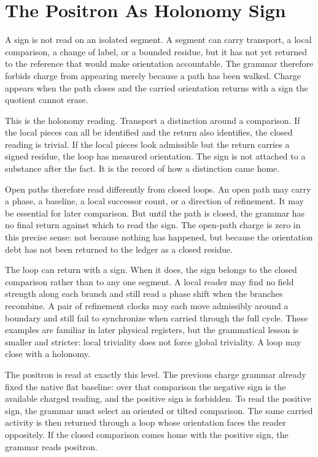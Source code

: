 \section{The Positron As Holonomy Sign}

A sign is not read on an isolated segment. A segment can carry transport, a
local comparison, a change of label, or a bounded residue, but it has not yet
returned to the reference that would make orientation accountable. The grammar
therefore forbids charge from appearing merely because a path has been
walked. Charge appears when the path closes and the carried orientation
returns with a sign the quotient cannot erase.

This is the holonomy reading. Transport a distinction around a comparison.
If the local pieces can all be identified and the return also identifies, the
closed reading is trivial. If the local pieces look admissible but the return
carries a signed residue, the loop has measured orientation. The sign is not
attached to a substance after the fact. It is the record of how a
distinction came home.

Open paths therefore read differently from closed loops. An open path may
carry a phase, a baseline, a local successor count, or a direction of
refinement. It may be essential for later comparison. But until the path is
closed, the grammar has no final return against which to read the sign. The
open-path charge is zero in this precise sense: not because nothing has
happened, but because the orientation debt has not been returned to the
ledger as a closed residue.

The loop can return with a sign. When it does, the sign belongs to the closed
comparison rather than to any one segment. A local reader may find no field
strength along each branch and still read a phase shift when the branches
recombine. A pair of refinement clocks may each move admissibly around a
boundary and still fail to synchronize when carried through the full cycle.
These examples are familiar in later physical registers, but the
grammatical lesson is smaller and stricter: local triviality does not force
global triviality. A loop may close with a holonomy.

The positron is read at exactly this level. The previous charge grammar
already fixed the native flat baseline: over that comparison the negative
sign is the available charged reading, and the positive sign is forbidden.
To read the positive sign, the grammar must select an oriented or tilted
comparison. The same carried activity is then returned through a loop whose
orientation faces the reader oppositely. If the closed comparison comes home
with the positive sign, the grammar reads positron.


